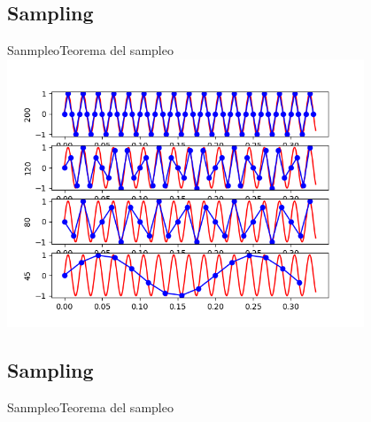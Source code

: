 \documentclass{beamer}
\begin{document}
\begin{darkframes}
    \subsection{Sampling}
   \begin{frame}{Sanmpleo}{Teorema del sampleo}
      \center\includegraphics[width=0.8\textwidth]{1_clase/teorema_sampleo}
      \vfill
   \end{frame}
    \subsection{Sampling}
   \begin{frame}{Sanmpleo}{Teorema del sampleo}
      
      \vfill
   \end{frame}























































\end{darkframes}
\end{document}
